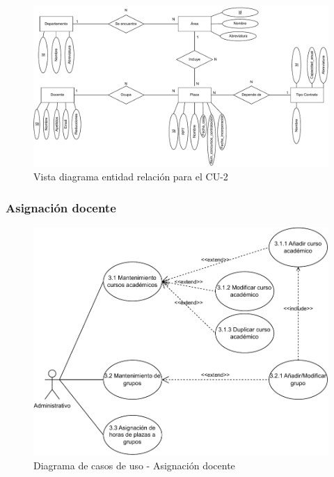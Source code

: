 \begin{figure}[!h]
	\centering
	\includegraphics[scale=0.7]{../img/Anexos/Casos uso/Vistas ER/Diagrama E-R CU 2.pdf}
	\caption{Vista diagrama entidad relación para el CU-2}\label{er_cu2}
\end{figure}
\FloatBarrier

\newpage
\subsubsection{Asignación docente}
\begin{figure}[!h]
	\centering
	\includegraphics[scale=0.9]{../img/Anexos/Casos uso/Diagrama casos de uso 4.pdf}
	\caption{Diagrama de casos de uso - Asignación docente}
\end{figure}
\FloatBarrier

